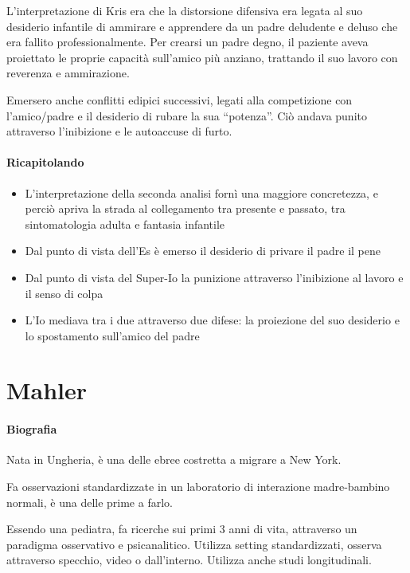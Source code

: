 \documentclass[12pt, a4paper]{article}
\begin{document}
L'interpretazione di Kris era che la distorsione difensiva era legata al suo desiderio infantile di ammirare e apprendere da un padre deludente e deluso che era fallito professionalmente. Per crearsi un padre degno, il paziente aveva proiettato le proprie capacit\`a sull'amico pi\`u anziano, trattando il suo lavoro con reverenza e ammirazione.

Emersero anche conflitti edipici successivi, legati alla competizione con l'amico/padre e il desiderio di rubare la sua ``potenza''. Ciò andava punito attraverso l'inibizione e le autoaccuse di furto.

\paragraph{Ricapitolando}
\begin{itemize}
    \item L'interpretazione della seconda analisi forn\`i una maggiore concretezza, e perciò apriva la strada al collegamento tra presente e passato, tra sintomatologia adulta e fantasia infantile
    \item Dal punto di vista dell'Es \`e emerso il desiderio di privare il padre il pene
    \item Dal punto di vista del Super-Io la punizione attraverso l'inibizione al lavoro e il senso di colpa
    \item L'Io mediava tra i due attraverso due difese: la proiezione del suo desiderio e lo spostamento sull'amico del padre

\end{itemize}

\section{Mahler}

\paragraph{Biografia} Nata in Ungheria, \`e una delle ebree costretta a migrare a New York.

Fa osservazioni standardizzate in un laboratorio di interazione madre-bambino normali, \`e una delle prime a farlo.

Essendo una pediatra, fa ricerche sui primi 3 anni di vita, attraverso un paradigma osservativo e psicanalitico. Utilizza setting standardizzati, osserva attraverso specchio, video o dall'interno.
Utilizza anche studi longitudinali.
\end{document}
